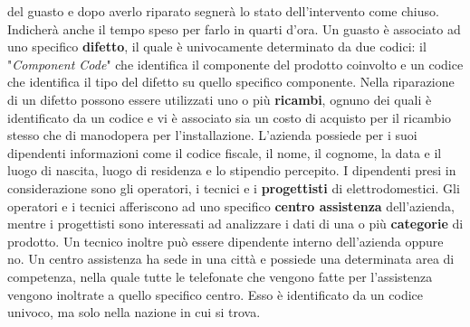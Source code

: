 \documentclass[a4paper, 12pt]{report}
\begin{document}
del guasto e dopo averlo riparato segnerà lo stato dell'intervento come chiuso. Indicherà anche il tempo speso per farlo in quarti d'ora.\newline
Un guasto è associato ad uno specifico \textbf{difetto}, il quale è univocamente determinato da due codici: il "\textit{Component Code}"
che identifica il componente del prodotto coinvolto e un codice che identifica il tipo del difetto su quello specifico componente. Nella
riparazione di un difetto possono essere utilizzati uno o più \textbf{ricambi}, ognuno dei quali è identificato da un codice e vi è associato
sia un costo di acquisto per il ricambio stesso che di manodopera per l'installazione.\newline
L'azienda possiede per i suoi dipendenti informazioni come il codice fiscale, il nome, il cognome, la data e il luogo di nascita, luogo di
residenza e lo stipendio percepito. I dipendenti presi in considerazione sono gli operatori, i tecnici e i
\textbf{progettisti} di elettrodomestici. Gli operatori e i tecnici afferiscono ad uno specifico \textbf{centro assistenza} dell'azienda,
mentre i progettisti sono interessati ad analizzare i dati di una o più \textbf{categorie} di prodotto. Un tecnico inoltre può essere
dipendente interno dell'azienda oppure no.\newline
Un centro assistenza ha sede in una città e possiede una determinata area di competenza, nella quale tutte le telefonate che vengono fatte
per l'assistenza vengono inoltrate a quello specifico centro. Esso è identificato da un codice univoco, ma solo nella nazione in cui si trova.\newline
\end{document}
